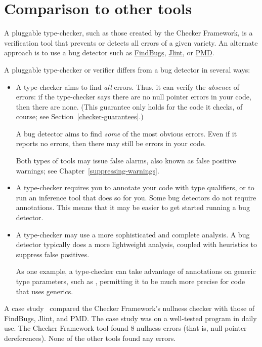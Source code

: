 \section{Comparison to other tools\label{other-tools}}

A pluggable type-checker, such as those created by the Checker Framework,
is a verification tool that prevents or detects all errors of a given variety.  An
alternate approach is to use a bug detector such as
\href{http://findbugs.sourceforge.net/}{FindBugs},
\href{http://jlint.sourceforge.net/}{Jlint}, or
\href{https://pmd.github.io}{PMD}.

A pluggable type-checker or verifier
differs from a bug detector in several ways:
\begin{itemize}
\item
  A type-checker aims to find \emph{all} errors.  Thus, it can verify the
  \emph{absence} of errors:  if the type-checker says there are no null
  pointer errors in your code, then there are none.  (This guarantee only
  holds for the code it checks, of course; see
  Section~\ref{checker-guarantees}.)

  A bug detector aims to find \emph{some} of the most obvious errors.  Even
  if it reports no errors, then there may still be errors in your code.

  Both types of tools may issue false alarms,
  also known as false positive warnings;
  see Chapter~\ref{suppressing-warnings}.

\item
  A type-checker requires you to annotate your code with type qualifiers,
  or to run an inference tool that does so for you.  Some bug detectors do not
  require annotations.  This means that it may be easier to get started
  running a bug detector.

\item
  A type-checker may use a more sophisticated and complete analysis.
  A bug detector typically does a more lightweight analysis, coupled with
  heuristics to suppress false positives.

  As one example, a type-checker can take advantage of annotations on
  generic type parameters, such as , permitting
  it to be much more precise for code that uses generics.

\end{itemize}

A case study~\cite[\S6]{PapiACPE2008} compared the Checker Framework's nullness
checker with those of FindBugs, Jlint, and PMD\@.  The case study was on a
well-tested program in daily use.  The Checker Framework tool found 8
nullness errors (that is, null pointer dereferences).  None of the other
tools found any errors.

